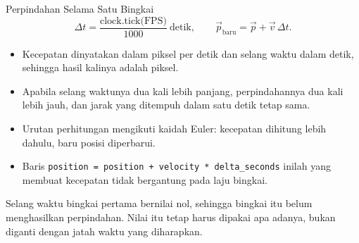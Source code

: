 \documentclass[aspectratio=169,10pt]{beamer}
\begin{document}
\begin{frame}{Perpindahan Selama Satu Bingkai}
\[
\Delta t = \frac{\text{clock.tick(FPS)}}{1000}\ \text{detik},
\qquad
\vec{p}_{\text{baru}} = \vec{p} + \vec{v}\,\Delta t .
\]
\begin{itemize}
  \item Kecepatan dinyatakan dalam piksel per detik dan selang waktu dalam
        detik, sehingga hasil kalinya adalah piksel.
  \item Apabila selang waktunya dua kali lebih panjang, perpindahannya dua kali
        lebih jauh, dan jarak yang ditempuh dalam satu detik tetap sama.
  \item Urutan perhitungan mengikuti kaidah Euler: kecepatan dihitung lebih
        dahulu, baru posisi diperbarui.
  \item Baris \texttt{position = position + velocity * delta\_seconds} inilah
        yang membuat kecepatan tidak bergantung pada laju bingkai.
\end{itemize}
\vspace{0.14cm}
\begin{kotak}
Selang waktu bingkai pertama bernilai nol, sehingga bingkai itu belum
menghasilkan perpindahan. Nilai itu tetap harus dipakai apa adanya, bukan
diganti dengan jatah waktu yang diharapkan.
\end{kotak}
\end{frame}
\end{document}
